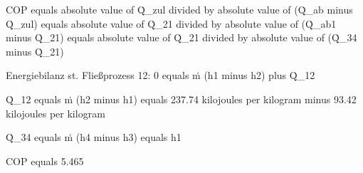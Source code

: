 COP equals absolute value of Q̇_zul divided by absolute value of (Q̇_ab minus Q̇_zul)  
equals absolute value of Q̇_21 divided by absolute value of (Q̇_ab1 minus Q̇_21)  
equals absolute value of Q̇_21 divided by absolute value of (Q̇_34 minus Q̇_21)  

Energiebilanz st. Fließprozess 12:  
0 equals ṁ (h1 minus h2) plus Q̇_12  

Q̇_12 equals ṁ (h2 minus h1)  
equals 237.74 kilojoules per kilogram minus 93.42 kilojoules per kilogram  

Q̇_34 equals ṁ (h4 minus h3)  
equals h1  

COP equals 5.465